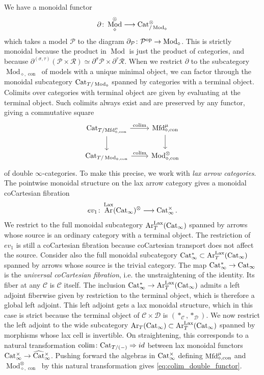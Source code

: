 \documentclass[10pt]{amsart}
\numberwithin{equation}{section}
\theoremstyle{definition}
\DeclareMathOperator{\Mod}{Mod}
\DeclareMathOperator{\op}{op}
\DeclareMathOperator{\Lax}{Lax}
\DeclareMathOperator{\Ar}{Ar}
\DeclareMathOperator{\con}{con}
\DeclareMathOperator*{\colim}{colim}
\newcommand{\Cat}{\mathrm{Cat}\vphantom{t}}
\newcommand{\CatHat}{\widehat{\mathrm{Cat}}\vphantom{t}}
\newcommand{\Mfd}{\mathrm{Mfd}\vphantom{d}}
\newcommand{\cC}{\mathcal{C}}
\newcommand{\calD}{\mathcal{D}}
\newcommand{\cP}{\mathcal{P}}
\newcommand{\cR}{\mathcal{R}}
\newcommand{\del}{\partial}
\renewcommand{\to}{\mathchoice{\longrightarrow}{\rightarrow}{}{}}
\begin{document}
We have a monoidal functor
\begin{align*}
	\del \colon \Mod^{\otimes}_{\diamond} \to \Cat_{/\Mod_{\diamond}}^{\otimes}
\end{align*}
which takes a model $\cP$ to the diagram $\del_{\cP} \colon \cP^{\op} \to \Mod_{\diamond}$.
This is strictly monoidal because the product in $\Mod$ is just the product of categories, and because $\del^{(\sigma,\tau)}(\cP\times \cR ) \simeq \del^{\sigma}\cP \times \del^{\tau}\cR$.
When we restrict $\del$ to the subcategory $\Mod_{\diamond,\con}$ of models with a unique minimal object, we can factor through the monoidal subcategory $\Cat_{T/\Mod_{\diamond}}$ spanned by categories with a terminal object.
Colimits over categories with terminal object are given by evaluating at the terminal object.
Such colimits always exist and are preserved by any functor, giving a commutative square
\begin{equation}\label{eq:colim_double_functor}
	\begin{tikzcd}
		\Cat_{T/\Mfd_{\diamond,\con}^{\mu}} \arrow[r, "\colim"] \arrow[d]      &   \Mfd_{\diamond,\con}^{\mu}  \arrow[d] \\
		\Cat_{T/\Mod_{\diamond,\con}}  \arrow[r, "\colim"]               &      \Mod_{\diamond,\con}^{\otimes}
	\end{tikzcd}
\end{equation}
of double $\infty$-categories.
To make this precise, we work with \emph{lax arrow categories}.
The pointwise monoidal structure on the lax arrow category gives a monoidal coCartesian fibration
\begin{align*}
	ev_{1}\colon \Ar^{\Lax}(\Cat_{\infty})^{\otimes} \to \Cat_{\infty}^{\times} \,.
\end{align*}
We restrict to the full monoidal subcategory $\Ar^{\Lax}_{T}(\Cat_{\infty})$ spanned by arrows whose source is an ordinary category with a terminal object.
The restriction of $ev_{1}$ is still a coCartesian fibration because coCartesian transport does not affect the source.
Consider also the full monoidal subcategory $\Cat_{\infty}^{\ast} \subset \Ar^{\Lax}_{T}(\Cat_{\infty})$ spanned by arrows whose source is the trivial category. The map $\Cat_{\infty}^{\ast} \to \Cat_{\infty}$ is the \emph{universal coCartesian fibration}, i.e. the unstraightening of the identity. Its fiber at any $\cC$ is $\cC$ itself.
The inclusion $\Cat_{\infty}^{\ast} \to \Ar^{\Lax}_{T}(\Cat_{\infty})$ admits a left adjoint fiberwise given by restriction to the terminal object, which is therefore a global left adjoint.
This left adjoint gets a lax monoidal structure, which in this case is strict because the terminal object of $\cC\times \calD$ is $(\ast_{\cC},\ast_{\calD})$.
We now restrict the left adjoint to the wide subcategory $\Ar_{T}(\Cat_{\infty}) \subset \Ar^{\Lax}_{T}(\Cat_{\infty})$ spanned by morphisms whose lax cell is invertible.
On straightening, this corresponds to a natural transformation $\colim \colon \Cat_{T /(-)} \Rightarrow id$ between lax monoidal functors $\Cat_{\infty}^{\times} \to \CatHat_{\infty}^{\times}$.
Pushing forward the algebras in $\Cat_{\infty}^{\times}$ defining $\Mfd_{\diamond,\con}^{\mu}$ and $\Mod_{\diamond,\con}^{\otimes}$ by this natural transformation gives \eqref{eq:colim_double_functor}.
\end{document}
